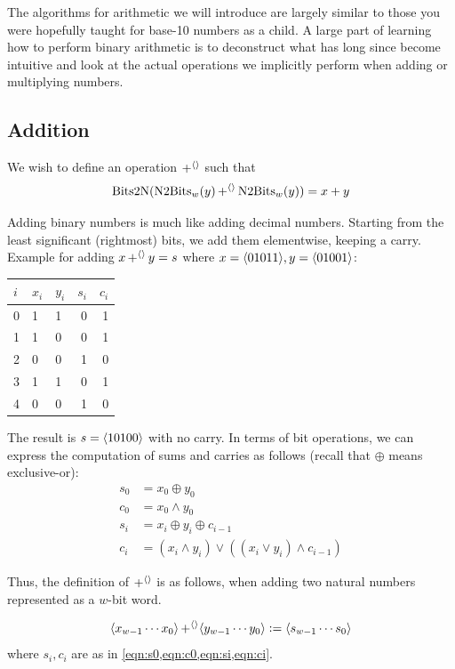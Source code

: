 The algorithms for arithmetic we will introduce are largely similar to
those you were hopefully taught for base-10 numbers as a child.  A
large part of learning how to perform binary arithmetic is to
deconstruct what has long since become intuitive and look at the
actual operations we implicitly perform when adding or multiplying
numbers.

\subsection{Addition}
\label{sec:bit-addition}

We wish to define an operation $\operatorname{+^{\langle\rangle}}$ such that
\begin{equation}
  \mathrm{Bits2N}(\mathrm{N2Bits}_{w}(y)\operatorname{+^{\langle\rangle}}{}\mathrm{N2Bits}_{w}(y)) = x + y
\end{equation}

Adding binary numbers is much like adding decimal numbers.  Starting
from the least significant (rightmost) bits, we add them elementwise,
keeping a carry.  Example for adding $x\operatorname{+^{\langle\rangle}}{} y=s$ where
$x=\langle 01011 \rangle, y=\langle 01001 \rangle$:

\begin{center}
\begin{tabular}{l|llrr}
  $i$ & $x_{i}$ & $y_{i}$ & $s_{i}$ & $c_{i}$ \\\midrule
  0 & 1 & 1 & 0 & 1 \\
  1 & 1 & 0 & 0 & 1 \\
  2 & 0 & 0 & 1 & 0 \\
  3 & 1 & 1 & 0 & 1 \\
  4 & 0 & 0 & 1 & 0
\end{tabular}
\end{center}

The result is $s=\langle 10100 \rangle$ with no carry.  In terms of bit
operations, we can express the computation of sums and carries as
follows (recall that $\oplus$ means exclusive-or):
\begin{align}
  s_{0} &= x_{0} \oplus y_{0} \label{eqn:s0} \\
  c_{0} &= x_{0} \land y_{0} \label{eqn:c0} \\
  s_{i} &= x_{i} \oplus y_{i} \oplus c_{i-1} \label{eqn:si} \\
  c_{i} &= (x_{i} \land y_{i})\lor ((x_{i}\lor y_{i})\land c_{i-1}) \label{eqn:ci}
\end{align}

Thus, the definition of $\operatorname{+^{\langle\rangle}}$ is as follows, when adding two
natural numbers represented as a $w$-bit word.
\begin{definition}
\begin{align*}
  \langle x_{w-1}\cdots{}x_{0} \rangle \operatorname{+^{\langle\rangle}} \langle y_{w-1}\cdots{}y_{0} \rangle \vcentcolon=
  \langle s_{w-1}\cdots{}s_{0} \rangle
\end{align*}
where $s_{i},c_{i}$ are as in \cref{eqn:s0,eqn:c0,eqn:si,eqn:ci}.
\label{def:intadd}
\end{definition}


